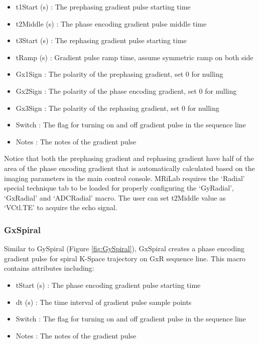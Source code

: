 \documentclass{book}%
\begin{document}
\begin{itemize}
	\item t1Start (s) : The prephasing gradient pulse starting time
	\item t2Middle (s) : The phase encoding gradient pulse middle time
	\item t3Start (s) : The rephasing gradient pulse starting time
	\item tRamp (s) : Gradient pulse ramp time, assume symmetric ramp on both side
	\item Gx1Sign : The polarity of the prephasing gradient, set 0 for nulling
	\item Gx2Sign : The polarity of the phase encoding gradient, set 0 for nulling
  \item Gx3Sign : The polarity of the rephasing gradient, set 0 for nulling
	\item Switch : The flag for turning on and off gradient pulse in the sequence line
	\item Notes : The notes of the gradient pulse 
\end{itemize}

Notice that both the prephasing gradient and rephasing gradient have half of the area of the phase encoding gradient that is automatically calculated based on the imaging parameters in the main control console. MRiLab requires the `Radial' special technique tab to be loaded for properly configuring the `GyRadial', `GxRadial' and `ADCRadial' macro. The user can set t2Middle value as `VCtl.TE' to acquire the echo signal.

\subsubsection{GxSpiral}

Similar to GySpiral (Figure \ref{fig:GySpiral}), GxSpiral creates a phase encoding gradient pulse for spiral K-Space trajectory on GxR sequence line. This macro contains attributes including:

\begin{itemize}
	\item tStart (s) : The phase encoding gradient pulse starting time
	\item dt (s) : The time interval of gradient pulse sample points
	\item Switch : The flag for turning on and off gradient pulse in the sequence line
	\item Notes : The notes of the gradient pulse 
\end{itemize}
\end{document}
